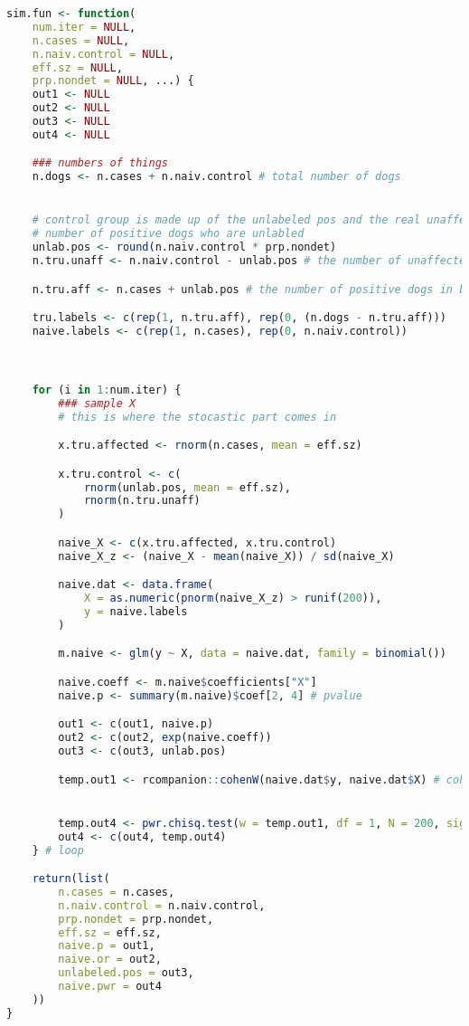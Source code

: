 \documentclass{article}
\begin{document}
\begin{lstlisting}[language=R]
sim.fun <- function(
    num.iter = NULL,
    n.cases = NULL,
    n.naiv.control = NULL,
    eff.sz = NULL,
    prp.nondet = NULL, ...) {
    out1 <- NULL
    out2 <- NULL
    out3 <- NULL
    out4 <- NULL

    ### numbers of things
    n.dogs <- n.cases + n.naiv.control # total number of dogs


    # control group is made up of the unlabeled pos and the real unaffected
    # number of positive dogs who are unlabled
    unlab.pos <- round(n.naiv.control * prp.nondet)
    n.tru.unaff <- n.naiv.control - unlab.pos # the number of unaffected

    n.tru.aff <- n.cases + unlab.pos # the number of positive dogs in both groups

    tru.labels <- c(rep(1, n.tru.aff), rep(0, (n.dogs - n.tru.aff)))
    naive.labels <- c(rep(1, n.cases), rep(0, n.naiv.control))



    for (i in 1:num.iter) {
        ### sample X
        # this is where the stocastic part comes in

        x.tru.affected <- rnorm(n.cases, mean = eff.sz)

        x.tru.control <- c(
            rnorm(unlab.pos, mean = eff.sz),
            rnorm(n.tru.unaff)
        )

        naive_X <- c(x.tru.affected, x.tru.control)
        naive_X_z <- (naive_X - mean(naive_X)) / sd(naive_X)

        naive.dat <- data.frame(
            X = as.numeric(pnorm(naive_X_z) > runif(200)),
            y = naive.labels
        )

        m.naive <- glm(y ~ X, data = naive.dat, family = binomial())

        naive.coeff <- m.naive$coefficients["X"]
        naive.p <- summary(m.naive)$coef[2, 4] # pvalue

        out1 <- c(out1, naive.p)
        out2 <- c(out2, exp(naive.coeff))
        out3 <- c(out3, unlab.pos)

        temp.out1 <- rcompanion::cohenW(naive.dat$y, naive.dat$X) # cohen_w


        temp.out4 <- pwr.chisq.test(w = temp.out1, df = 1, N = 200, sig.level = 0.05)$power
        out4 <- c(out4, temp.out4)
    } # loop

    return(list(
        n.cases = n.cases,
        n.naiv.control = n.naiv.control,
        prp.nondet = prp.nondet,
        eff.sz = eff.sz,
        naive.p = out1,
        naive.or = out2,
        unlabeled.pos = out3,
        naive.pwr = out4
    ))
}
\end{lstlisting}
\end{document}
